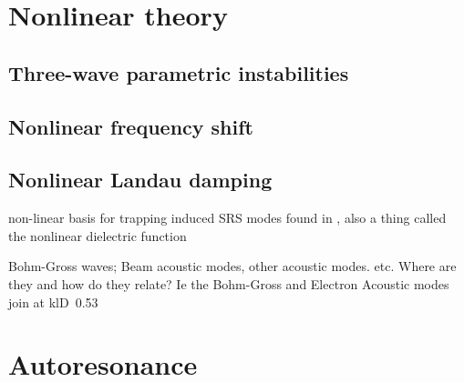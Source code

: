 \section{Nonlinear theory}
\subsection{Three-wave parametric instabilities}
\subsection{Nonlinear frequency shift}
\subsection{Nonlinear Landau damping}
non-linear basis for trapping induced SRS modes found in \cite{Rose2001}, also
 a thing called the nonlinear dielectric function



Bohm-Gross waves; Beam acoustic modes, other acoustic modes.
etc. Where are they and how do they relate? Ie the Bohm-Gross and Electron
Acoustic modes join at klD~0.53

\section{Autoresonance}



